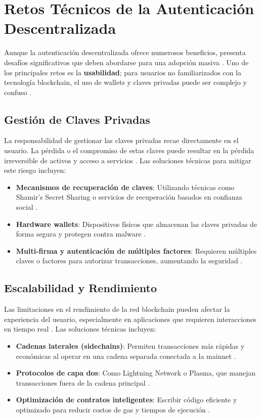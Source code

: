 \section{Retos Técnicos de la Autenticación Descentralizada}

Aunque la autenticación descentralizada ofrece numerosos beneficios, presenta desafíos significativos que deben abordarse para una adopción masiva \cite{tschorsch2016bitcoin}. Uno de los principales retos es la \textbf{usabilidad}; para usuarios no familiarizados con la tecnología blockchain, el uso de wallets y claves privadas puede ser complejo y confuso \cite{parizi2018empirical}.

\subsection{Gestión de Claves Privadas}

La responsabilidad de gestionar las claves privadas recae directamente en el usuario. La pérdida o el compromiso de estas claves puede resultar en la pérdida irreversible de activos y acceso a servicios \cite{eskandari2018first}. Las soluciones técnicas para mitigar este riesgo incluyen:

\begin{itemize}
    \item \textbf{Mecanismos de recuperación de claves}: Utilizando técnicas como Shamir's Secret Sharing o servicios de recuperación basados en confianza social \cite{shamir1979share}.
    \item \textbf{Hardware wallets}: Dispositivos físicos que almacenan las claves privadas de forma segura y protegen contra malware \cite{palatinus2013trezor}.
    \item \textbf{Multi-firma y autenticación de múltiples factores}: Requieren múltiples claves o factores para autorizar transacciones, aumentando la seguridad \cite{kosba2016hawk}.
\end{itemize}

\subsection{Escalabilidad y Rendimiento}

Las limitaciones en el rendimiento de la red blockchain pueden afectar la experiencia del usuario, especialmente en aplicaciones que requieren interacciones en tiempo real \cite{croman2016scaling}. Las soluciones técnicas incluyen:

\begin{itemize}
    \item \textbf{Cadenas laterales (sidechains)}: Permiten transacciones más rápidas y económicas al operar en una cadena separada conectada a la mainnet \cite{back2014enabling}.
    \item \textbf{Protocolos de capa dos}: Como Lightning Network o Plasma, que manejan transacciones fuera de la cadena principal \cite{poon2016bitcoin, pundit2017plasma}.
    \item \textbf{Optimización de contratos inteligentes}: Escribir código eficiente y optimizado para reducir costos de gas y tiempos de ejecución \cite{antonopoulos2018mastering}.
\end{itemize}


